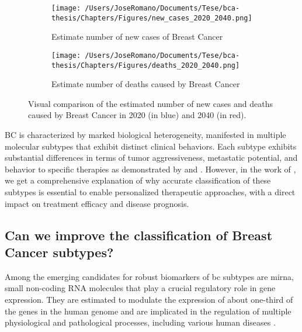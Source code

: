 \begin{figure}[h!]
  \centering
  \begin{subfigure}[b]{0.45\textwidth}
    \centering
    \texttt{[image: /Users/JoseRomano/Documents/Tese/bca-thesis/Chapters/Figures/new\_cases\_2020\_2040.png]}
    \caption{Estimate number of new cases of Breast Cancer}
    \label{fig:new_cases_2020_2040}
  \end{subfigure}
  \vspace{0.5cm}
  \begin{subfigure}[b]{0.45\textwidth}
    \centering
    \texttt{[image: /Users/JoseRomano/Documents/Tese/bca-thesis/Chapters/Figures/deaths\_2020\_2040.png]}
    \caption{Estimate number of deaths caused by Breast Cancer}
    \label{fig:deaths_2020_2040}
  \end{subfigure}
  \caption{Visual comparison of the estimated number of new cases and deaths caused by Breast Cancer
    in 2020 (in blue) and 2040 (in red). \cite{GLOBOCAN2022}}
  \label{fig:estimates_2020_2040}
\end{figure}

BC is characterized by marked biological heterogeneity, manifested in multiple
molecular subtypes that exhibit distinct clinical behaviors. Each subtype
exhibits substantial differences in terms of tumor aggressiveness, metastatic
potential, and behavior to specific therapies as demonstrated by
\textcite{bc_subtypes_Prat2015Clinical} and \textcite{bc_molecular_Perou2000}.
However, in the work of \textcite{need_for_subtype_treatments_Testa2020Breast},
we get a comprehensive explanation of why accurate classification of these
subtypes is essential to enable personalized therapeutic approaches, with a
direct impact on treatment efficacy and disease prognosis.

\subsection{Can we improve the classification of Breast Cancer subtypes?}
Among the emerging candidates for robust biomarkers of \gls{bc} subtypes are
\gls{mirna}, small non-coding RNA molecules that play a crucial regulatory role
in gene expression. They are estimated to modulate the expression of about
one-third of the genes in the human genome
\cite{mirna_importance_Hammond2015An} and are implicated in the regulation of
multiple physiological and pathological processes, including various human
diseases \cite{mirna_as_biomarkers_Ho2022}.

